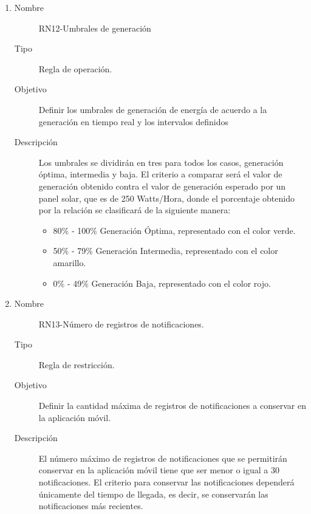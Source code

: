 \begin{enumerate}[label=RN\arabic*.]
\item \label{RN12}
		\begin{description}
			\item[Nombre] RN12-Umbrales de generación
			\item[Tipo] Regla de operación.
			\item[Objetivo] Definir los umbrales de generación de energía de acuerdo a la generación en tiempo real y los intervalos definidos 
			\item[Descripción] Los umbrales se dividirán  en tres para todos los casos, generación óptima, intermedia y baja.
			El criterio a comparar será el valor de generación obtenido contra el valor de generación esperado por un panel solar, que es de 250 Watts/Hora, donde el porcentaje obtenido por la relación se clasificará de la siguiente manera:
			\begin{itemize}
			    \item 80\% - 100\% Generación Óptima, representado con el color verde.
			    \item 50\% - 79\% Generación Intermedia, representado con el color amarillo.
			    \item 0\% - 49\% Generación Baja, representado con el color rojo.
			\end{itemize}
		\end{description}
	
\item \label{RN13}
		\begin{description}
			\item[Nombre] RN13-Número de registros de notificaciones.
			\item[Tipo] Regla de restricción.
			\item[Objetivo] Definir la cantidad máxima de registros de notificaciones a conservar en la aplicación móvil.
			\item[Descripción] El número máximo de registros de notificaciones que se permitirán conservar en la aplicación móvil tiene que ser menor o igual a 30 notificaciones. El criterio para conservar las notificaciones dependerá únicamente del tiempo de llegada, es decir, se conservarán las notificaciones más recientes.   
		\end{description}
		

\end{enumerate}

